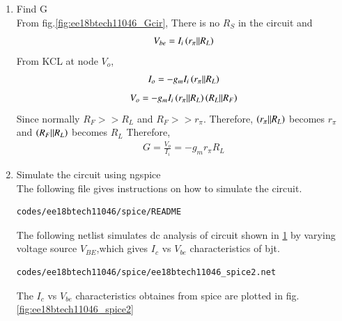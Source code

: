 \begin{enumerate}[label=\arabic*.,ref=\theenumi]
\item Find G
\\
\solution
From fig.\ref{fig:ee18btech11046_Gcir},
There is no $R_{S}$ in the circuit and
\begin{align}
V_{be} = I_{i}\left(r_{\pi}||R_{L}\right)
\end{align}
From KCL at node $V_{o}$,
\begin{align}
I_{o} = -g_{m}I_{i}\left(r_{\pi}||R_{L}\right)
\end{align}
\begin{align}
V_{o} = -g_{m}I_{i}\left(r_{\pi}||R_{L}\right)\left(R_{L}||R_{F}\right)
\end{align}
Since normally $R_{F}>>R_{L}$ and $R_{F}>>r_{\pi}$. Therefore, $\left(r_{\pi}||R_{L}\right)$ becomes $r_{\pi}$ and $\left(R_{F}||R_{L}\right)$ becomes $R_{L}$
Therefore,
\begin{align}
G =\frac{V_{o}}{I_{i}} = -g_{m}r_{\pi}R_{L}
\end{align}

\item Simulate the circuit using ngspice
\\
\solution
The following file gives instructions on how to simulate the circuit.
\begin{lstlisting}
codes/ee18btech11046/spice/README
\end{lstlisting}

%
\begin{figure}[ht!]
	\begin{center}
		\resizebox{\columnwidth}{!}{}
	\end{center}
	\caption{}
	\label{fig:ee18btech11046_spiceCircuit}
\end{figure}
%

The following netlist simulates dc analysis of circuit shown in \ref{fig:ee18btech11046_spiceCircuit} by varying voltage source $V_{BE}$,which gives $I_{c}$ vs $V_{be}$ characteristics of bjt.
\begin{lstlisting}
codes/ee18btech11046/spice/ee18btech11046_spice2.net
\end{lstlisting}

The $I_{c}$ vs $V_{be}$ characteristics obtaines from spice are plotted in fig.\ref{fig:ee18btech11046_spice2}


\end{enumerate}
